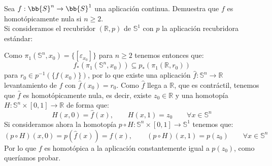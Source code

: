 \documentclass[12pt]{article}
\begin{document}
    \begin{ejercicio}\label{ej:4}
        Sea $f:\bb{S}^n\to \bb{S}^1$ una aplicación continua. Demuestra que $f$ es homotópicamente nula si $n\geq 2$.\\

        \noindent
        Si consideramos el recubridor $(\mathbb{R},p)$ de $\mathbb{S}^1$ con $p$ la aplicación recubridora estándar:
        \begin{figure}[H]
            \centering
        \end{figure}
        \noindent
        Como $\pi_1(\mathbb{S}^n,x_0) = \{[\varepsilon_{x_0}]\}$ para $n\geq 2$ tenemos entonces que:
        \begin{equation*}
            f_\ast(\pi_1(\mathbb{S}^n,x_0))\subseteq p_\ast(\pi_1(\mathbb{R},r_0))
        \end{equation*}
        para $r_0 \in p^{-1}(\{f(x_0)\})$, por lo que existe una aplicación $\hat{f}:\mathbb{S}^n\to \mathbb{R}$ levantamiento de $f$ con $\hat{f}(x_0) = r_0$. Como $\hat{f}$ llega a $\mathbb{R}$, que es contráctil, tenemos que $\hat{f}$ es homotópicamente nula, es decir, existe $z_0 \in \mathbb{R}$ y una homotopía $H:\mathbb{S}^n\times [0,1]\to \mathbb{R}$ de forma que:
                \begin{equation*}
                    H(x,0) = \hat{f}(x), \qquad H(x,1) = z_0 \qquad \forall x\in \mathbb{S}^n
                \end{equation*}
                Si consideramos ahora la homotopía $p\circ H:\mathbb{S}^n\times [0,1]\to \mathbb{S}^1$ tenemos que:
                \begin{equation*}
                    (p\circ H)(x,0) = p(\hat{f}(x)) = f(x), \qquad (p\circ H)(x,1)=p(z_0) \qquad \forall x\in \mathbb{S}^n
                \end{equation*}
                Por lo que $f$ es homotópica a la aplicación constantemente igual a $p(z_0)$, como queríamos probar.

    \end{ejercicio}
\end{document}
